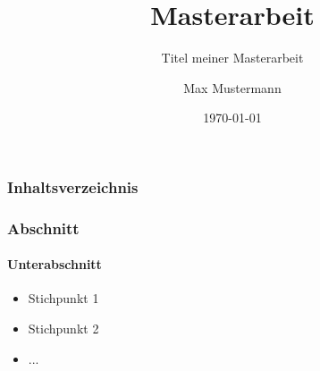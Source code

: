\documentclass{beamer}
\title{Masterarbeit}
\subtitle{Titel meiner Masterarbeit}
\author{Max Mustermann}
\date{\today}
\institute{Hochschule Musterstadt}
\begin{document}
\begin{frame}
	\titlepage
\end{frame}

\begin{frame}
	\frametitle{Inhaltsverzeichnis}
	\tableofcontents
\end{frame}

\begin{frame}
\frametitle{Abschnitt}
\framesubtitle{Unterabschnitt}
\begin{itemize}
	\item Stichpunkt 1
	\item Stichpunkt 2
	\item ...
\end{itemize}
\end{frame}
\end{document}
